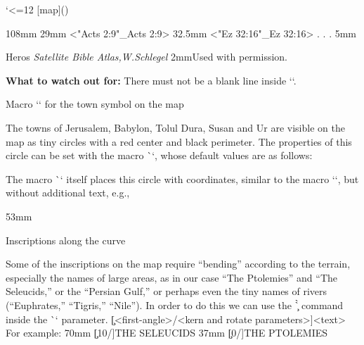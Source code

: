 \begtt \catcode`<=12
[map](){
  \Heros \cond {}\rm %
  \vskip-1mm 
  \putstext 2mm 108mm {%
  }%
  \LMfonts\sans {}\rm
  \puttext 145mm 29mm {<"Acts 2:9"_Acts 2:9>}
  \puttext 145mm 32.5mm {<"Ez 32:16"_Ez 32:16>}
   .
   .
   .
  \puttext 2mm 5mm{{{{Heros \it Satellite Bible Atlas,\rm W.Schlegel}}
  \puttext 2mm 2mm{\Heros {}\rm Used with permission.}
}%
\endtt


{\bf What to watch out for:} 
 There must not be a blank line inside `\insertBot`.



\secc[town] Macro `\town` for the town symbol on the map


The towns of Jerusalem, Babylon, Tolul Dura, Susan and Ur are visible on the map as tiny circles 
with a red center and black perimeter.
The properties of this circle can be set with the macro \`\townparams`, whose default values are 
as follows:

\begtt
\def\townparams{
   \hhkern=.8pt %
   \lwidth=.5pt %
   \fcolor=\Red %
   \lcolor=\Black %
}
\endtt

The macro \`\town` itself places this circle with coordinates, similar to the macro `\puttext`, 
but without additional text, e.g.,

\begtt
  \town 101.5mm 53mm %
\endtt



\secc[maptitles] Inscriptions along the curve

Some of the inscriptions on the map require “bending” according to the terrain, especially the 
names of large areas, as in our case  “The Ptolemies” and “The Seleucids,” or the “Persian 
Gulf,” or perhaps even the tiny names of rivers (“Euphrates,” “Tigris,” “Nile”). 
In order to do this we can use the \`\c` command inside the \`\puttext` parameter.
\begtt
\c[<first-angle>/<kern and rotate parameters>]{<text>}
\endtt
For example:
\begtt
\puttext 62mm 70mm {\c[10/\kern7pt]{THE SELEUCIDS}}
\puttext 2mm 37mm {\c[0/\kern4pt]{THE PTOLEMIES}}
\endtt

}}

